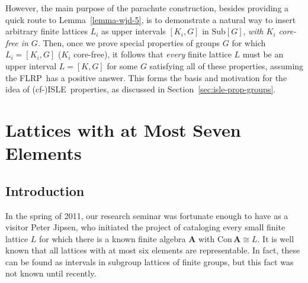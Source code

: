 \documentclass[cm,dissertation,actual,final]{uhthesis}
\theoremstyle{plain}
\theoremstyle{definition}
\theoremstyle{remark}
\numberwithin{theorem}{section}
\numberwithin{claim}{chapter}
\numberwithin{equation}{section}
\numberwithin{conjecture}{chapter}
\newcommand{\<}{\ensuremath{\langle}}
\renewcommand{\>}{\ensuremath{\rangle}}
\newcommand{\Con}{\ensuremath{\mathrm{Con\,}}}
\newcommand{\Sub}{\ensuremath{\mathrm{Sub}}}
\newcommand{\FLRP}{{\small FLRP}}
\newcommand{\0}{\ensuremath{\mathbf{0}}}
\newcommand{\1}{\ensuremath{\mathbf{1}}}
\newcommand{\2}{\ensuremath{\mathbf{2}}}
\newcommand{\3}{\ensuremath{\mathbf{3}}}
\newcommand{\4}{\ensuremath{\mathbf{4}}}
\newcommand{\5}{\ensuremath{\mathbf{5}}}
\newcommand{\bA}{\ensuremath{\mathbf{A}}}
\newcommand{\ISLE}{{\small ISLE}}
\begin{document}
However, the main purpose of the parachute construction, besides providing
a quick route to Lemma~\ref{lemma-wjd-5},
is to demonstrate a natural way to insert arbitrary finite lattices $L_i$ as
upper intervals $[K_i, G]$ in $\Sub[G]$, {\it with $K_i$ core-free in $G$}.
Then, once we prove special properties of
groups $G$ for which $L_i = [K_i, G]$ ($K_i$ core-free), 
it follows that \emph{every} finite lattice $L$ must be an upper
interval $L = [K, G]$ for some $G$ satisfying all of these properties,
assuming the \FLRP\ has a positive answer.  This forms the basis and motivation 
for the idea of (cf-)\ISLE\ properties, as discussed in
Section~\ref{sec:isle-prop-groups}. 

\chapter{Lattices with at Most Seven Elements}
\label{cha:lattices-with-at}
\section{Introduction}
In the spring of 2011, our research seminar was fortunate enough to have 
as a visitor 
%
Peter Jipsen, who initiated the project of cataloging
every small finite lattice $L$ for which there is a known finite algebra 
$\bA$ with $\Con\bA\cong L$. 
It is well known that all lattices with at most six elements are representable.
In fact, these can be found as intervals in subgroup lattices of finite groups,
but this fact was not known until recently.  
\end{document}
